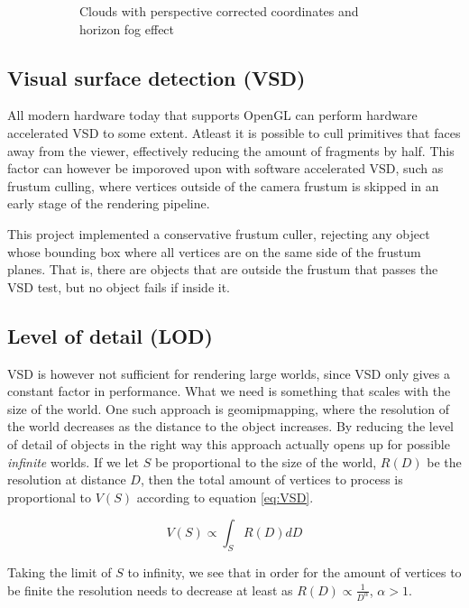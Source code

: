 \documentclass{article}
\begin{document}
\begin{figure}[H]
\begin{subfigure}[b]{0.45\textwidth}
        \caption{Clouds with perspective corrected coordinates and horizon fog effect}
        \label{fig:cloudProjFog}
    \end{subfigure}
    \caption{}
    \label{fig:clouds}
\end{figure}

\subsection{Visual surface detection (VSD)} \label{sec:VSD}
All modern hardware today that supports OpenGL can perform hardware accelerated VSD to some extent.
Atleast it is possible to cull primitives that faces away from the viewer, effectively reducing the amount of fragments by half.
This factor can however be imporoved upon with software accelerated VSD, such as frustum culling, where vertices outside of the camera frustum is skipped in an early stage of the rendering pipeline.

This project implemented a conservative frustum culler, rejecting any object whose bounding box where all vertices are on the same side of the frustum planes.
That is, there are objects that are outside the frustum that passes the VSD test, but no object fails if inside it. %

\subsection{Level of detail (LOD)} \label{sec:LOD}
VSD is however not sufficient for rendering large worlds, since VSD only gives a constant factor in performance.
What we need is something that scales with the size of the world.
One such approach is geomipmapping, where the resolution of the world decreases as the distance to the object increases.
By reducing the level of detail of objects in the right way this approach actually opens up for possible \emph{infinite} worlds.
If we let $S$ be proportional to the size of the world, $R(D)$ be the resolution at distance $D$, then the total amount of vertices to process is proportional to $V(S)$ according to equation \ref{eq:VSD}.

\begin{equation}
    V(S) \propto \int_S R(D) dD
    \label{eq:VSD}
\end{equation}

Taking the limit of $S$ to infinity, we see that in order for the amount of vertices to be finite the resolution needs to decrease at least as $R(D) \propto \frac{1}{D^\alpha}$, $\alpha > 1$.
\end{document}
